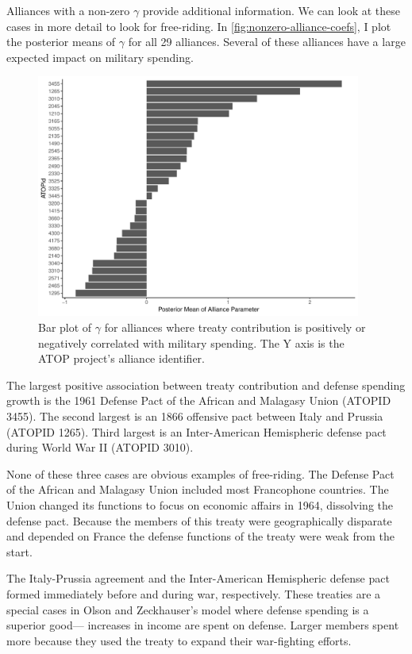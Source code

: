 \documentclass[12pt]{article}
\begin{document}
Alliances with a non-zero $\gamma$ provide additional information. 
We can look at these cases in more detail to look for free-riding. 
In \autoref{fig:nonzero-alliance-coefs}, I plot the posterior means of $\gamma$ for all 29 alliances.  
Several of these alliances have a large expected impact on military spending. 


\begin{figure}
	\centering
		\includegraphics[width=0.95\textwidth]{nonzero-alliance-coefs.pdf}
	\caption{Bar plot of $\gamma$ for alliances where treaty contribution is positively or negatively correlated with military spending. The Y axis is the ATOP project's alliance identifier.}	
	\label{fig:nonzero-alliance-coefs}
\end{figure}


The largest positive association between treaty contribution and defense spending growth is the 1961 Defense Pact of the African and Malagasy Union (ATOPID 3455). 
The second largest is an 1866 offensive pact between Italy and Prussia (ATOPID 1265). 
Third largest is an Inter-American Hemispheric defense pact during World War II (ATOPID 3010). 


None of these three cases are obvious examples of free-riding. 
The Defense Pact of the African and Malagasy Union included most Francophone countries. 
The Union changed its functions to focus on economic affairs in 1964, dissolving the defense pact. 
Because the members of this treaty were geographically disparate and depended on France the defense functions of the treaty were weak from the start. 


The Italy-Prussia agreement and the Inter-American Hemispheric defense pact formed immediately before and during war, respectively. 
These treaties are a special cases in Olson and Zeckhauser's model where defense spending is a superior good--- increases in income are spent on defense. 
Larger members spent more because they used the treaty to expand their war-fighting efforts. 
\end{document}
